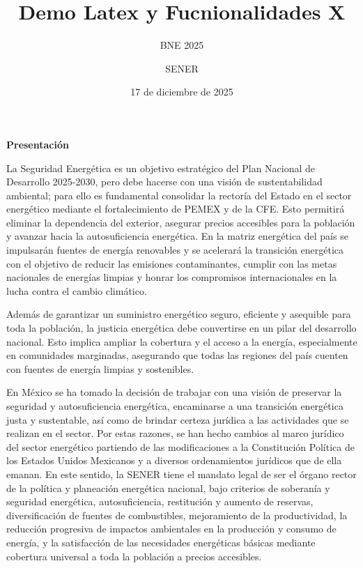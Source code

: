 \documentclass{sener2025}
\title{Demo Latex y Fucnionalidades X}
\subtitle{BNE 2025}
\author{SENER}
\date{17 de diciembre de 2025}
\begin{document}

\tableofcontents
\newpage

\listafiguras
\newpage

\listatablas
\newpage

\clearpage
\begin{center}
{\Large\patriafont\bfseries\color{gobmxGuinda}Presentación}\\[1cm]
\end{center}

La Seguridad Energética es un objetivo estratégico del Plan Nacional de Desarrollo 2025-2030, pero debe hacerse con una visión de sustentabilidad ambiental; para ello es fundamental consolidar la rectoría del Estado en el sector energético mediante el fortalecimiento de PEMEX y de la CFE. Esto permitirá eliminar la dependencia del exterior, asegurar precios accesibles para la población y avanzar hacia la autosuficiencia energética. En la matriz energética del país se impulsarán fuentes de energía renovables y se acelerará la transición energética con el objetivo de reducir las emisiones contaminantes, cumplir con las metas nacionales de energías limpias y honrar los compromisos internacionales en la lucha contra el cambio climático.

Además de garantizar un suministro energético seguro, eficiente y asequible para toda la población, la justicia energética debe convertirse en un pilar del desarrollo nacional. Esto implica ampliar la cobertura y el acceso a la energía, especialmente en comunidades marginadas, asegurando que todas las regiones del país cuenten con fuentes de energía limpias y sostenibles.

En México se ha tomado la decisión de trabajar con una visión de preservar la seguridad y autosuficiencia energética, encaminarse a una transición energética justa y sustentable, así como de brindar certeza jurídica a las actividades que se realizan en el sector. Por estas razones, se han hecho cambios al marco jurídico del sector energético partiendo de las modificaciones a la Constitución Política de los Estados Unidos Mexicanos y a diversos ordenamientos jurídicos que de ella emanan. En este sentido, la SENER tiene el mandato legal de ser el órgano rector de la política y planeación energética nacional, bajo criterios de soberanía y seguridad energética, autosuficiencia, restitución y aumento de reservas, diversificación de fuentes de combustibles, mejoramiento de la productividad, la reducción progresiva de impactos ambientales en la producción y consumo de energía, y la satisfacción de las necesidades energéticas básicas mediante cobertura universal a toda la población a precios accesibles.
\end{document}

